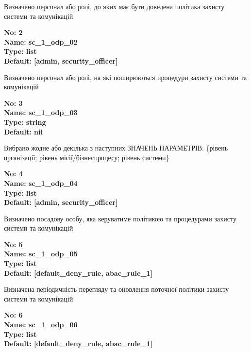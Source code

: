 \documentclass{article}
\begin{document}
{\footnotesize Визначено персонал або ролі, до яких має бути доведена політика захисту системи та комунікацій}


{\footnotesize\bfseries
No: 2\\
Name: sc\_\allowbreak{}1\_\allowbreak{}odp\_\allowbreak{}02\\
Type: list\\
Default: [\textquotedbl{}admin\textquotedbl{}, \textquotedbl{}security\_\allowbreak{}officer\textquotedbl{}]
}

{\footnotesize Визначено персонал або ролі, на які поширюються процедури захисту системи та комунікацій}


{\footnotesize\bfseries
No: 3\\
Name: sc\_\allowbreak{}1\_\allowbreak{}odp\_\allowbreak{}03\\
Type: string\\
Default: nil
}

{\footnotesize Вибрано жодне або декілька з наступних ЗНАЧЕНЬ ПАРАМЕТРІВ: \{рівень організації; рівень місії/бізнеспроцесу; рівень системи\}}


{\footnotesize\bfseries
No: 4\\
Name: sc\_\allowbreak{}1\_\allowbreak{}odp\_\allowbreak{}04\\
Type: list\\
Default: [\textquotedbl{}admin\textquotedbl{}, \textquotedbl{}security\_\allowbreak{}officer\textquotedbl{}]
}

{\footnotesize Визначено посадову особу, яка керуватиме політикою та процедурами захисту системи та комунікацій}


{\footnotesize\bfseries
No: 5\\
Name: sc\_\allowbreak{}1\_\allowbreak{}odp\_\allowbreak{}05\\
Type: list\\
Default: [\textquotedbl{}default\_\allowbreak{}deny\_\allowbreak{}rule\textquotedbl{}, \textquotedbl{}abac\_\allowbreak{}rule\_\allowbreak{}1\textquotedbl{}]
}

{\footnotesize Визначена періодичність перегляду та оновлення поточної політики захисту системи та комунікацій}


{\footnotesize\bfseries
No: 6\\
Name: sc\_\allowbreak{}1\_\allowbreak{}odp\_\allowbreak{}06\\
Type: list\\
Default: [\textquotedbl{}default\_\allowbreak{}deny\_\allowbreak{}rule\textquotedbl{}, \textquotedbl{}abac\_\allowbreak{}rule\_\allowbreak{}1\textquotedbl{}]
}
\end{document}
